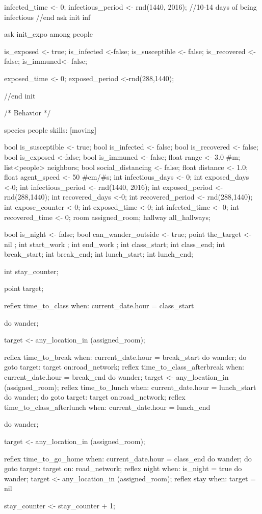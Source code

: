\begin{verbatimtab}[4]
{{{           infected_time <- 0;
           infectious_period <- rnd(1440, 2016); //10-14 days of being infectious
        }//end ask init inf   
        
        ask init_expo among people{
        	is_exposed <- true;
        	is_infected <-false;
        	is_susceptible <- false;
        	is_recovered <- false;
        	is_immuned<- false;
        	
        	exposed_time <- 0;
        	exposed_period <-rnd(288,1440); 
        	
        }
		
   }//end init 
   

/* Behavior  */

	species people skills: [moving] {
		bool is_susceptible <- true;
	    bool is_infected <- false;
	    bool is_recovered <- false;
	    bool is_exposed <-false;
	    bool is_immuned <- false;
	    float range <- 3.0 #m;
	    list<people> neighbors;
	    bool social_distancing <- false;
	    float distance <- 1.0;
	    float agent_speed <- 50 #cm/#s;
	    int infectious_days <- 0;
	    int exposed_days <-0;
	    int infectious_period <- rnd(1440, 2016);
	    int exposed_period <- rnd(288,1440);
	    int recovered_days <-0;
	    int recovered_period <- rnd(288,1440);
	    int expose_counter <-0;
	    int exposed_time <-0;
	    int infected_time <- 0;
	    int recovered_time <- 0;
	    room assigned_room;
	    hallway all_hallways;
	    
	    bool is_night <- false;
	    bool can_wander_outside <- true;
	    point the_target <- nil ;
		int start_work ;
		int end_work  ;
		int class_start;
		int class_end;
		int break_start;
		int break_end;
		int lunch_start;
		int lunch_end;
		
		int stay_counter;
	
		
		point target;
	    
	reflex time_to_class when: current_date.hour = class_start{
		do wander;
		
		target <- any_location_in (assigned_room);
	}
	reflex time_to_break when: current_date.hour = break_start{
		do wander;
		do goto target: target on:road_network;	
	}
	reflex time_to_class_afterbreak when: current_date.hour = break_end{
		do wander;
		target <- any_location_in (assigned_room);	
	}
	reflex time_to_lunch when: current_date.hour = lunch_start{
		do wander;
		do goto target: target on:road_network;	
	}
	reflex time_to_class_afterlunch when: current_date.hour = lunch_end{
		do wander;
		
		target <- any_location_in (assigned_room);
	}	
	reflex time_to_go_home when: current_date.hour = class_end{
		do wander;
		do goto target: target on: road_network;
	} 
	reflex night when: is_night = true{
		do wander;
		target <- any_location_in (assigned_room);
	}
	reflex stay when: target = nil {
		stay_counter <- stay_counter + 1;
		
}}}
\end{verbatimtab}
